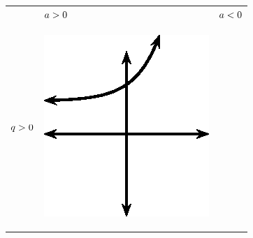         \begin{center}
      \label{m39348*uid186}
    \noindent
      \tablelasttail{}
      \begin{xtabular*}{\mytablewidth}[t]{|p{10\mystarwidth}|p{10\mystarwidth}|p{10\mystarwidth}|}\hline
         &
                  $a>{}0$
                 &
                  $a<{}0$
     \tabularnewline{}
                  $q>{}0$
                 &
    \setcounter{subfigure}{0}
\label{m39348*id250546}
    \begin{center}
    \label{m39348*id250546!!!underscore!!!media}\label{m39348*id250546!!!underscore!!!printimage}\includegraphics[width=.3\columnwidth]{col11306.imgs/m39348_MG10C11_028.png} %
      \vspace{2pt}
    \vspace{.1in}
    \end{center}    

\end{xtabular*}
\end{center}
